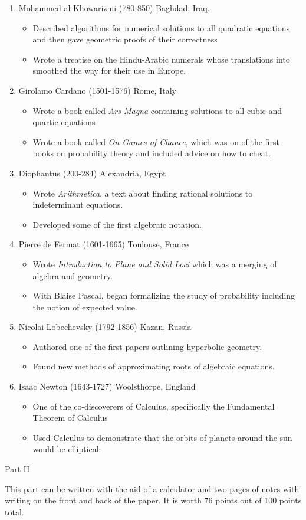 \documentclass[11pt]{article}
\def\bc{\begin{center}}
\def\ec{\end{center}}
\def\be{\begin{enumerate}}
\def\ee{\end{enumerate}}
\def\bi{\begin{itemize}}
\def\ei{\end{itemize}}
\begin{document}
\be
\item Mohammed al-Khowarizmi (780-850) Baghdad, Iraq.
\bi
\item Described algorithms for numerical solutions to all quadratic equations and then gave geometric proofs of their correctness
\item Wrote a treatise on the Hindu-Arabic numerals whose translations into smoothed the way for their use in Europe.
\ei
\vfill
\item Girolamo Cardano (1501-1576) Rome, Italy
\bi
\item Wrote a book called \emph{Ars Magna} containing solutions to all cubic and quartic equations
\item Wrote a book called \emph{On Games of Chance}, which was on of the first books on probability theory and included advice on how to cheat. 
\ei
\vfill
\item Diophantus (200-284) Alexandria, Egypt
\bi
\item Wrote \emph{Arithmetica}, a text about finding rational solutions to indeterminant equations.
\item Developed some of the first algebraic notation.
\ei
\vfill
\item Pierre de Fermat (1601-1665) Toulouse, France
\bi
\item Wrote \emph{Introduction to Plane and Solid Loci} which was a merging of algebra and geometry.
\item With Blaise Pascal, began formalizing the study of probability including the notion of expected value.
\ei
\vfill
\item Nicolai Lobechevsky (1792-1856) Kazan, Russia
\bi
\item Authored one of the first papers outlining hyperbolic geometry.
\item Found new methods of approximating roots of algebraic equations.
\ei
\vfill
\item Isaac Newton (1643-1727) Woolsthorpe, England
\bi
\item One of the co-discoverers of Calculus, specifically the Fundamental Theorem of Calculus
\item Used Calculus to demonstrate that the orbits of planets around the sun would be elliptical.
\ei
\vfill
\ee
\newpage
\bc Part II \ec

This part can be written with the aid of a calculator and two pages of notes with writing on the front and back of the paper. It is worth 76 points out of 100 points total. \\
\end{document}

